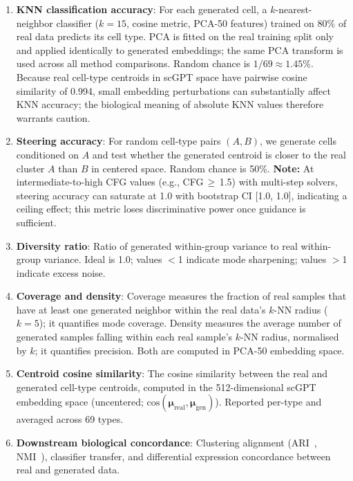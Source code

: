 \documentclass[biology,article,submit,pdftex,moreauthors]{Definitions/mdpi}
\begin{document}
\begin{enumerate}
\item \textbf{KNN classification accuracy}: For each generated cell, a $k$-nearest-neighbor classifier ($k{=}15$, cosine metric, PCA-50 features) trained on 80\% of real data predicts its cell type. PCA is fitted on the real training split only and applied identically to generated embeddings; the same PCA transform is used across all method comparisons. Random chance is $1/69 \approx 1.45\%$. Because real cell-type centroids in scGPT space have pairwise cosine similarity of 0.994, small embedding perturbations can substantially affect KNN accuracy; the biological meaning of absolute KNN values therefore warrants caution.
\item \textbf{Steering accuracy}: For random cell-type pairs $(A, B)$, we generate cells conditioned on $A$ and test whether the generated centroid is closer to the real cluster $A$ than $B$ in centered space. Random chance is 50\%. \textbf{Note:} At intermediate-to-high CFG values (e.g., CFG$\,\geq\,$1.5) with multi-step solvers, steering accuracy can saturate at 1.0 with bootstrap CI [1.0, 1.0], indicating a ceiling effect; this metric loses discriminative power once guidance is sufficient.
\item \textbf{Diversity ratio}: Ratio of generated within-group variance to real within-group variance. Ideal is 1.0; values $<$1 indicate mode sharpening; values $>$1 indicate excess noise.
\item \textbf{Coverage and density}: Coverage measures the fraction of real samples that have at least one generated neighbor within the real data's $k$-NN radius ($k{=}5$); it quantifies mode coverage. Density measures the average number of generated samples falling within each real sample's $k$-NN radius, normalised by $k$; it quantifies precision. Both are computed in PCA-50 embedding space.
\item \textbf{Centroid cosine similarity}: The cosine similarity between the real and generated cell-type centroids, computed in the 512-dimensional scGPT embedding space (uncentered; $\text{cos}(\boldsymbol{\mu}_\text{real}, \boldsymbol{\mu}_\text{gen})$). Reported per-type and averaged across 69 types.
\item \textbf{Downstream biological concordance}: Clustering alignment (ARI~\cite{ref-ari}, NMI~\cite{ref-nmi}), classifier transfer, and differential expression concordance between real and generated data.
\end{enumerate}
\end{document}
